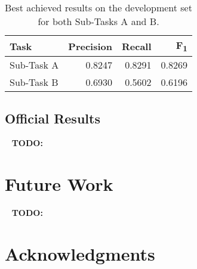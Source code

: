 \documentclass[11pt,a4paper]{article}
\begin{document}
\begin{table}
\begin{center}
\begin{tabular}{|l|r|r|r|}
\hline\centering\textbf{Task}  & \textbf{Precision} &  \textbf{Recall} &  \textbf{F\textsubscript{1}}\\
\hline
 Sub-Task A   & 0.8247 & 0.8291 & 0.8269 \\
 Sub-Task B   & 0.6930 & 0.5602 & 0.6196 \\
\hline
\end{tabular}
\end{center}
\caption{\label{devset-results} Best achieved results on the development set for both Sub-Tasks A and B.}
\end{table}









\subsection{Official Results}

\ \newline
\textbf{TODO:}
\ \newline

\section{Future Work}\label{future}



\ \newline
\textbf{TODO:}
\ \newline




\section*{Acknowledgments}

\ \newline
\newpage


\end{document}
